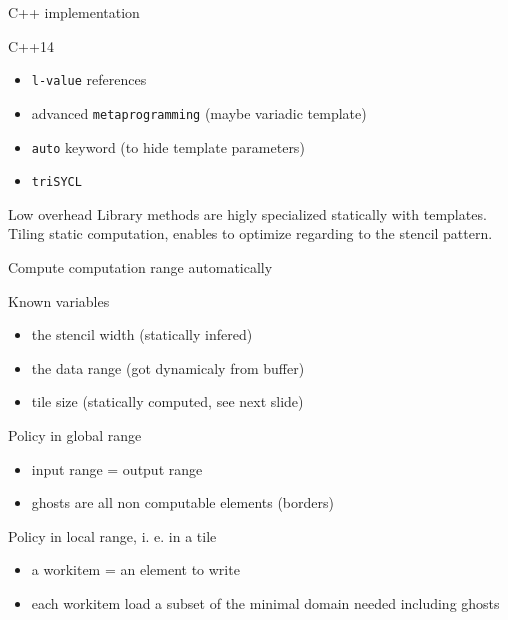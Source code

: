\documentclass[10pt, compress]{beamer}
\begin{document}
\begin{frame}{C++ implementation}

\begin{block}{C++14}
\begin{itemize}
\item \texttt{l-value} references
\item advanced \texttt{metaprogramming} (maybe variadic template)
\item \texttt{auto} keyword (to hide template parameters)
\item \texttt{triSYCL}
\end{itemize}
\end{block}

\begin{block}{Low overhead}
Library methods are higly specialized statically with templates.\\
\alert{Tiling static computation}, enables to optimize regarding to the stencil pattern.
\end{block}

\end{frame}

\begin{frame}{Compute computation range automatically}

\begin{block}{Known variables}
\begin{itemize}
\item the stencil width (statically infered)
\item the data range (got dynamicaly from buffer)
\item tile size (statically computed, see next slide)
\end{itemize}
\end{block}

\begin{block}{Policy in global range}
\begin{itemize}
\item input range = output range
\item ghosts are all non computable elements (borders)
\end{itemize}
\end{block}

\begin{block}{Policy in local range, i. e. in a tile}
\begin{itemize}
\item a workitem = an element to write
\item each workitem load a subset of the minimal domain needed including ghosts
\end{itemize}


\end{block}

\end{frame}
\end{document}
